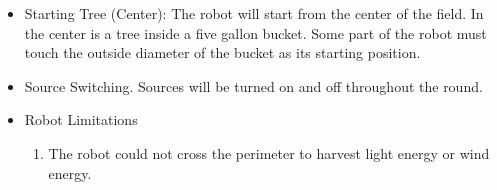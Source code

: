 \documentclass[12pt]{article}
\begin{document}
\begin{itemize}
	\item Starting Tree (Center): The robot will start from the center of the field. In the center is a tree inside a five gallon bucket. Some part of the robot must touch the outside diameter of the bucket as its starting position. 
	\item Source Switching. Sources will be turned on and off throughout the round. 
	\item Robot Limitations
		\begin {enumerate}
			\item The robot could not cross the perimeter to harvest light energy or wind energy. 
		\end {enumerate}
\end{itemize}
\end{document}

